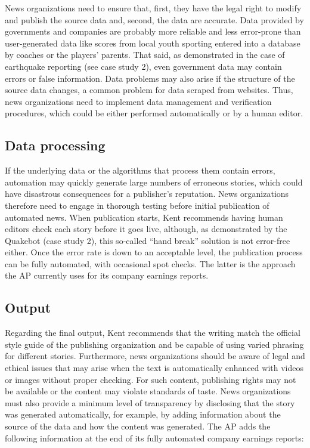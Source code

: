 \documentclass[notoc, symmetric, nobib, nols]{towcenter-guideto-book}
\begin{document}
News organizations need to ensure that, first, they have the legal right to modify and publish the source data and, second, the data are accurate. Data provided by governments and companies are probably more reliable and less error-prone than user-generated data like scores from local youth sporting entered into a database by coaches or the players' parents. That said, as demonstrated in the case of earthquake reporting (see case study 2), even government data may contain errors or false information. Data problems may also arise if the structure of the source data changes, a common problem for data scraped from websites. Thus, news organizations need to implement data management and verification procedures, which could be either performed automatically or by a human editor.

\subsection{Data processing}

If the underlying data or the algorithms that process them contain errors, automation may quickly generate large numbers of erroneous stories, which could have disastrous consequences for a publisher's reputation. News organizations therefore need to engage in thorough testing before initial publication of automated news. When publication starts, Kent recommends having human editors check each story before it goes live, although, as demonstrated by the Quakebot (case study 2), this so-called ``hand break'' solution is not error-free either. Once the error rate is down to an acceptable level, the publication process can be fully automated, with occasional spot checks. The latter is the approach the AP currently uses for its company earnings reports.

\subsection{Output} 

Regarding the final output, Kent recommends that the writing match the official style guide of the publishing organization and be capable of using varied phrasing for different stories. Furthermore, news organizations should be aware of legal and ethical issues that may arise when the text is automatically enhanced with videos or images without proper checking. For such content, publishing rights may not be available or the content may violate standards of taste. News organizations must also provide a minimum level of transparency by disclosing that the story was generated automatically, for example, by adding information about the source of the data and how the content was generated. The AP adds the following information at the end of its fully automated company earnings reports:
 
\end{document}
